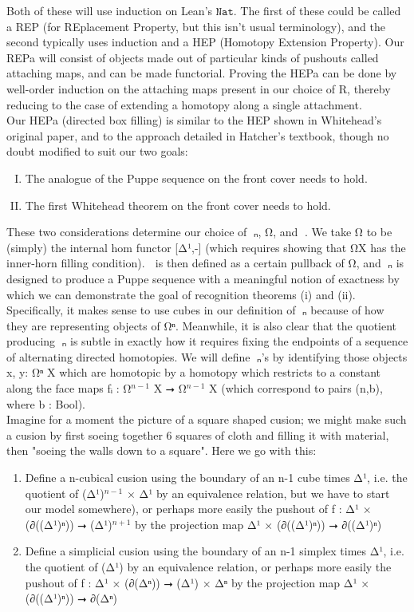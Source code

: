 \documentclass{book}
\theoremstyle{definition}
\begin{document}
Both of these will use induction on Lean's $\texttt{Nat}$. The first of these could be called a REP (for REplacement Property, but this isn't usual terminology), and the second typically uses induction and a HEP (Homotopy Extension Property). Our REPa will consist of objects made out of particular kinds of pushouts called attaching maps, and can be made functorial. Proving the HEPa can be done by well-order induction on the attaching maps present in our choice of R, thereby reducing to the case of extending a homotopy along a single attachment.\\

Our HEPa (directed box filling) is similar to the HEP shown in Whitehead's original paper, and to the approach detailed in Hatcher's textbook, though no doubt modified to suit our two goals:

\begin{enumerate}[(I)]
\item The analogue of the Puppe sequence on the front cover needs to hold.
\item The first Whitehead theorem on the front cover needs to hold.
\end{enumerate}

These two considerations determine our choice of π⃗ₙ, Ω⃗, and ω⃗. We take Ω⃗ to be (simply) the internal hom functor [Δ¹,-] (which requires showing that Ω⃗X has the inner-horn filling condition). ω⃗ is then defined as a certain pullback of Ω⃗, and π⃗ₙ is designed to produce a Puppe sequence with a meaningful notion of exactness by which we can demonstrate the goal of recognition theorems (i) and (ii). Specifically, it makes sense to use cubes in our definition of π⃗ₙ because of how they are representing objects of Ω⃗ⁿ. Meanwhile, it is also clear that the quotient producing π⃗ₙ is subtle in exactly how it requires fixing the endpoints of a sequence of alternating directed homotopies. We will define π⃗ₙ's by identifying those objects x, y: Ω⃗ⁿ X which are homotopic by a homotopy which restricts to a constant along the face maps fᵢ : Ω⃗${}^{n-1}$ X ⭢ Ω⃗${}^{n-1}$ X (which correspond to pairs (n,b), where b : Bool).\\

Imagine for a moment the picture of a square shaped cusion; we might make such a cusion by first soeing together 6 squares of cloth and filling it with material, then "soeing the walls down to a square". Here we go with this:

\begin{enumerate}
\item Define a n-cubical cusion using the boundary of an n-1 cube times Δ¹, i.e. the quotient of (Δ¹)${}^{n-1}$ × Δ¹ by an equivalence relation, but we have to start our model somewhere), or perhaps more easily the pushout of f : Δ¹ × (∂((Δ¹)ⁿ)) ⭢ (Δ¹)${}^{n+1}$ by the projection map Δ¹ × (∂((Δ¹)ⁿ)) ⭢ ∂((Δ¹)ⁿ)
\item Define a simplicial cusion using the boundary of an n-1 simplex times Δ¹, i.e. the quotient of (Δ¹) by an equivalence relation, or perhaps more easily the pushout of f : Δ¹ × (∂(Δⁿ)) ⭢ (Δ¹) × Δⁿ by the projection map Δ¹ × (∂((Δ¹)ⁿ)) ⭢ ∂(Δⁿ)
\end{enumerate}
\end{document}
